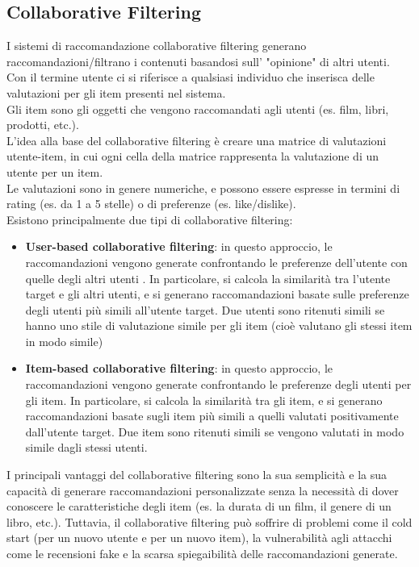 \subsection{Collaborative Filtering}
I sistemi di raccomandazione collaborative filtering generano raccomandazioni/filtrano i contenuti basandosi sull' "opinione" di altri utenti\cite{CFRS}.\\ Con il termine utente ci si riferisce a qualsiasi individuo che inserisca delle valutazioni per gli item presenti nel sistema\cite{CFRS}. \\ Gli item sono gli oggetti che vengono raccomandati agli utenti (es. film, libri, prodotti, etc.)\cite{CFRS}.\\
L'idea alla base del collaborative filtering è creare una matrice di valutazioni utente-item, in cui ogni cella della matrice rappresenta la valutazione di un utente per un item.\\ Le valutazioni sono in genere numeriche, e possono essere espresse in termini di rating (es. da 1 a 5 stelle) o di preferenze (es. like/dislike).\cite{CFRS}\\
Esistono principalmente due tipi di collaborative filtering:
\begin{itemize}
    \item \textbf{User-based collaborative filtering}: in questo approccio, le raccomandazioni vengono generate confrontando le preferenze dell'utente con quelle degli altri utenti \cite{CFRS}. In particolare, si calcola la similarità tra l'utente target e gli altri utenti, e si generano raccomandazioni basate sulle preferenze degli utenti più simili all'utente target. Due utenti sono ritenuti simili se hanno uno stile di valutazione simile per gli item (cioè valutano gli stessi item in modo simile)
    \item \textbf{Item-based collaborative filtering}: in questo approccio, le raccomandazioni vengono generate confrontando le preferenze degli utenti per gli item. In particolare, si calcola la similarità tra gli item, e si generano raccomandazioni basate sugli item più simili a quelli valutati positivamente dall'utente target. Due item sono ritenuti simili se vengono valutati in modo simile dagli stessi utenti\cite{ItemBased}.
\end{itemize}
I principali vantaggi del collaborative filtering sono la sua semplicità e la sua capacità di generare raccomandazioni personalizzate senza la necessità di dover conoscere le caratteristiche degli item (es. la durata di un film, il genere di un libro, etc.). Tuttavia, il collaborative filtering può soffrire di problemi come il cold start (per un nuovo utente e per un nuovo item), la vulnerabilità agli attacchi come le recensioni fake e la scarsa spiegaibilità delle raccomandazioni generate.\\


